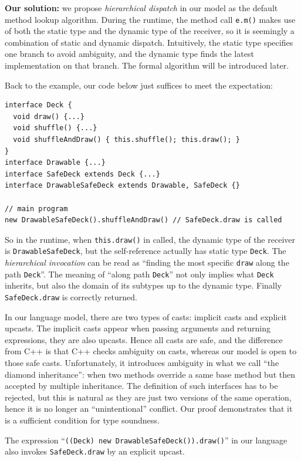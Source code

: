 \noindent\textbf{Our solution:} we propose \textit{hierarchical dispatch} in our model
as the default method lookup algorithm. During the runtime, the method call \lstinline|e.m()|
makes use of both the static type and the dynamic type of the receiver, so it is seemingly a
combination of static and dynamic dispatch. Intuitively, the static type specifies one branch
to avoid ambiguity, and the dynamic type finds the latest implementation on that branch. The formal algorithm
will be introduced later.

Back to the example, our code below just suffices to meet the expectation:
\vspace{3pt}\begin{lstlisting}
interface Deck {
  void draw() {...}
  void shuffle() {...}
  void shuffleAndDraw() { this.shuffle(); this.draw(); }
}
interface Drawable {...}
interface SafeDeck extends Deck {...}
interface DrawableSafeDeck extends Drawable, SafeDeck {}

// main program
new DrawableSafeDeck().shuffleAndDraw() // SafeDeck.draw is called
\end{lstlisting}\vspace{3pt}
So in the runtime, when \lstinline|this.draw()| in called,
the dynamic type of the receiver is \lstinline|DrawableSafeDeck|, but the self-reference actually
has static type \lstinline|Deck|. The \textit{hierarchical invocation} can be read as 
``finding the most specific \lstinline|draw| along the path \lstinline|Deck|''. The meaning of ``along path
\lstinline|Deck|'' not only implies what \lstinline|Deck| inherits, but also the domain of its subtypes up to the
dynamic type. Finally \lstinline|SafeDeck.draw| is correctly returned.

In our language model, there are two types of casts: implicit casts and explicit upcasts. The implicit casts appear
when passing arguments and returning expressions, they are also upcasts. Hence all casts are safe, and the difference
from C++ is that C++ checks ambiguity on casts, whereas our model is open to those safe casts. Unfortunately,
it introduces ambiguity in what we call ``the diamond inheritance'': when two methods override a same base method
but then accepted by multiple inheritance. The definition of such interfaces has to be rejected,
but this is natural as they are just two versions of the same operation, hence it is no longer an ``unintentional'' conflict.
Our proof demonstrates that it is a sufficient condition for type soundness.

The expression ``\lstinline|((Deck) new DrawableSafeDeck()).draw()|'' in our language also invokes \lstinline|SafeDeck.draw| 
by an explicit upcast.

